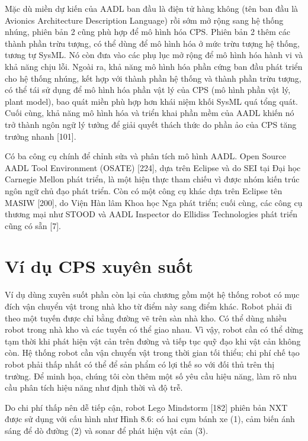 Mặc dù miền dự kiến của AADL ban đầu là điện tử hàng không (tên ban đầu là Avionics Architecture Description Language) rồi sớm mở rộng sang hệ thống nhúng, phiên bản 2 cũng phù hợp để mô hình hóa CPS. Phiên bản 2 thêm các thành phần trừu tượng, có thể dùng để mô hình hóa ở mức trừu tượng hệ thống, tương tự SysML. Nó còn đưa vào các phụ lục mở rộng để mô hình hóa hành vi và khả năng chịu lỗi. Ngoài ra, khả năng mô hình hóa phần cứng ban đầu phát triển cho hệ thống nhúng, kết hợp với thành phần hệ thống và thành phần trừu tượng, có thể tái sử dụng để mô hình hóa phần vật lý của CPS (mô hình phần vật lý, plant model), bao quát miền phù hợp hơn khái niệm khối SysML quá tổng quát. Cuối cùng, khả năng mô hình hóa và triển khai phần mềm của AADL khiến nó trở thành ngôn ngữ lý tưởng để giải quyết thách thức do phần ảo của CPS tăng trưởng nhanh [101].

Có ba công cụ chính để chỉnh sửa và phân tích mô hình AADL. Open Source AADL Tool Environment (OSATE) [224], dựa trên Eclipse và do SEI tại Đại học Carnegie Mellon phát triển, là một hiện thực tham chiếu vì được nhóm kiến trúc ngôn ngữ chủ đạo phát triển. Còn có một công cụ khác dựa trên Eclipse
tên MASIW [200], do Viện Hàn lâm Khoa học Nga phát triển; cuối cùng, các công cụ thương mại như STOOD và AADL Inspector do Ellidiss Technologies phát triển cũng có sẵn [7].

\section{Ví dụ CPS xuyên suốt}
Ví dụ dùng xuyên suốt phần còn lại của chương gồm một hệ thống robot có mục đích vận chuyển vật trong nhà kho từ điểm này sang điểm khác. Robot phải đi theo một tuyến được chỉ bằng đường vẽ trên sàn nhà kho. Có thể dùng nhiều robot trong nhà kho và các tuyến có thể giao nhau. Vì vậy, robot cần có thể dừng tạm thời khi phát hiện vật cản trên đường và tiếp tục quỹ đạo khi vật cản không còn. Hệ thống robot cần vận chuyển vật trong thời gian tối thiểu; chi phí chế tạo robot phải thấp nhất có thể để sản phẩm có lợi thế so với đối thủ trên thị trường. Để minh họa, chúng tôi còn thêm một số yêu cầu hiệu năng, làm rõ nhu cầu phân tích hiệu năng như định thời và độ trễ.

Do chi phí thấp nên dễ tiếp cận, robot Lego Mindstorm [182] phiên bản NXT được sử dụng với cấu hình như Hình 8.6: có hai cụm bánh xe (1), cảm biến ánh sáng để dò đường (2) và sonar để phát hiện vật cản (3).

